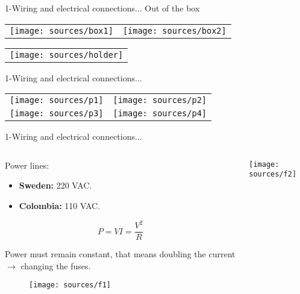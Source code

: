 \documentclass[handout]{beamer}
\begin{document}
\begin{frame}{1-Wiring and electrical connections...}
	Out of the box
	\begin{tabular}{cc}
		\texttt{[image: sources/box1]}
		& 
		\texttt{[image: sources/box2]}
	\end{tabular}

	\begin{table}[h]
		\begin{tabular}{c}
			\texttt{[image: sources/holder]}
		\end{tabular}
	\end{table}
\end{frame}

\begin{frame}{1-Wiring and electrical connections...}
	\begin{table}[h]
		\begin{tabular}{cc}
			\texttt{[image: sources/p1]}
			& 
			\texttt{[image: sources/p2]} \\
			\texttt{[image: sources/p3]}
			& 
			\texttt{[image: sources/p4]}
		\end{tabular}
	\end{table}
\end{frame}

\begin{frame}{1-Wiring and electrical connections...}
	\begin{columns}
		\begin{column}{0.7\textwidth}
			Power lines:
			\begin{itemize}
				\item \textbf{Sweden:} 220 VAC.
				\item \textbf{Colombia:} 110 VAC.
			\end{itemize}
			
			\begin{equation}
			P = VI = \dfrac{V^2}{R}
			\end{equation}
			
			Power must remain constant, that means doubling the current $\longrightarrow$ changing the fuses.
			
			\begin{figure}[h]
				\texttt{[image: sources/f1]}
			\end{figure}
		\end{column}
		\begin{column}{0.3\textwidth}
			\texttt{[image: sources/f2]}
		\end{column}
	\end{columns}
\end{frame}
\end{document}
